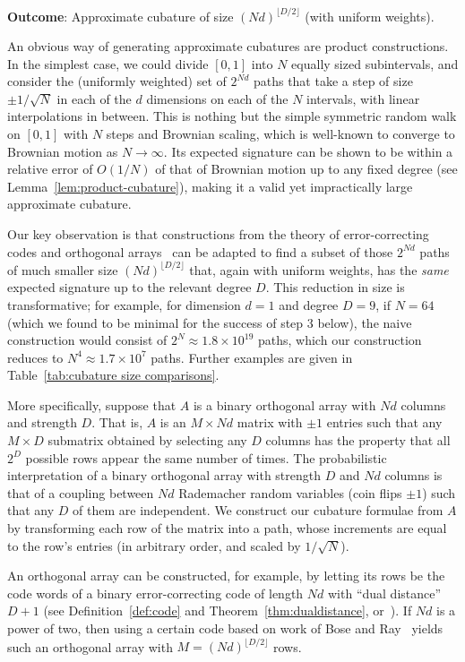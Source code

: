 \documentclass[11pt, letterpaper]{article}
\theoremstyle{definition}
\theoremstyle{remark}
\begin{document}
\par\noindent\textbf{Outcome}: Approximate cubature of size $(Nd)^{\lfloor D/2\rfloor}$ (with uniform weights).

An obvious way of generating approximate cubatures are product constructions. In the simplest case, we could divide $[0,1]$ into $N$ equally sized subintervals, and consider the (uniformly weighted) set of $2^{Nd}$ paths that take a step of size $\pm 1 / \sqrt{N}$ in each of the $d$ dimensions on each of the $N$ intervals, with linear interpolations in between. This is nothing but the simple symmetric random walk on $[0,1]$ with $N$ steps and Brownian scaling, which is well-known to converge to Brownian motion as $N\to \infty$. Its expected signature can be shown to be within a relative error of $O(1 / N)$ of that of Brownian motion up to any fixed degree (see Lemma~\ref{lem:product-cubature}), making it a valid yet impractically large approximate cubature.

Our key observation is that constructions from the theory of error-correcting codes and orthogonal arrays~\cite{hedayat1999,huffman2003} can be adapted to find a subset of those $2^{Nd}$ paths of much smaller size $(Nd)^{\lfloor D / 2\rfloor}$ that, again with uniform weights, has the \emph{same} expected signature up to the relevant degree $D$.
This reduction in size is transformative; for example, for dimension $d=1$ and degree $D=9$, if $N=64$ (which we found to be minimal for the success of step 3 below), the naive construction would consist of $2^N \approx 1.8\times 10^{19}$ paths, which our construction reduces to $N^4 \approx 1.7\times 10^7$ paths. Further examples are given in Table~\ref{tab:cubature size comparisons}.

More specifically, suppose that $A$ is a binary orthogonal array with $Nd$ columns and strength $D$. That is, $A$ is an $M \times Nd$ matrix with $\pm 1$ entries such that any $M \times D$ submatrix obtained by selecting any $D$ columns has the property that all $2^D$ possible rows appear the same number of times. The probabilistic interpretation of a binary orthogonal array with strength $D$ and $Nd$ columns is that of a coupling between $Nd$ Rademacher random variables (coin flips $\pm 1$) such that any $D$ of them are independent. We construct our cubature formulae from $A$ by transforming each row of the matrix into a path, whose increments are equal to the row's entries (in arbitrary order, and scaled by $1 / \sqrt{N}$).

An orthogonal array can be constructed, for example, by letting its rows be the code words of a binary error-correcting code of length $Nd$ with ``dual distance'' $D+1$ (see Definition~\ref{def:code} and Theorem~\ref{thm:dualdistance}, or~\cite[Thm.~4.9]{hedayat2012}). If $Nd$ is a power of two, then using a certain code based on work of Bose and Ray~\cite{bose-ray1960} yields such an orthogonal array with $M = (Nd)^{\lfloor D / 2\rfloor}$ rows.
\end{document}
